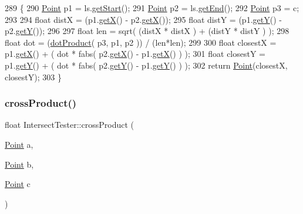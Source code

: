 \begin{DoxyCode}
289 \{
290     \hyperlink{class_point}{Point} p1 = ls.\hyperlink{class_line_segment_afcff6bd5f6a3073a44f7b21db0be876f}{getStart}();
291     \hyperlink{class_point}{Point} p2 = ls.\hyperlink{class_line_segment_a7b05f883c369b950e61009edfafbbd0e}{getEnd}();
292     \hyperlink{class_point}{Point} p3 = c;
293 
294     \textcolor{keywordtype}{float} distX = (p1.\hyperlink{class_point_a29c44ec7c7279e02629645a06cdaf7d5}{getX}() - p2.\hyperlink{class_point_a29c44ec7c7279e02629645a06cdaf7d5}{getX}());
295     \textcolor{keywordtype}{float} distY = (p1.\hyperlink{class_point_a2371ffadbe245d12a8f556d0a976521b}{getY}() - p2.\hyperlink{class_point_a2371ffadbe245d12a8f556d0a976521b}{getY}());
296 
297     \textcolor{keywordtype}{float} len = sqrt( (distX * distX ) + (distY * distY ) );
298     \textcolor{keywordtype}{float} dot = (\hyperlink{class_intersect_tester_acf0fb2d4e58655d8314b2409a46900c2}{dotProduct}( p3, p1, p2 )) / (len*len);
299 
300     \textcolor{keywordtype}{float} closestX = p1.\hyperlink{class_point_a29c44ec7c7279e02629645a06cdaf7d5}{getX}() + ( dot * fabs( p2.\hyperlink{class_point_a29c44ec7c7279e02629645a06cdaf7d5}{getX}() - p1.\hyperlink{class_point_a29c44ec7c7279e02629645a06cdaf7d5}{getX}() ) );
301     \textcolor{keywordtype}{float} closestY = p1.\hyperlink{class_point_a2371ffadbe245d12a8f556d0a976521b}{getY}() + ( dot * fabs( p2.\hyperlink{class_point_a2371ffadbe245d12a8f556d0a976521b}{getY}() - p1.\hyperlink{class_point_a2371ffadbe245d12a8f556d0a976521b}{getY}() ) );
302     \textcolor{keywordflow}{return} \hyperlink{class_point}{Point}(closestX, closestY);
303 \}
\end{DoxyCode}
\mbox{\label{class_intersect_tester_a1b966d15da1de1fab5350c8e81e0b70f}} 
\subsubsection{\texorpdfstring{cross\+Product()}{crossProduct()}}
{\footnotesize\ttfamily float Intersect\+Tester\+::cross\+Product (\begin{DoxyParamCaption}\item[{\hyperlink{class_point}{Point}}]{a,  }\item[{\hyperlink{class_point}{Point}}]{b,  }\item[{\hyperlink{class_point}{Point}}]{c }\end{DoxyParamCaption})\hspace{0.3cm}{\ttfamily [static]}}



